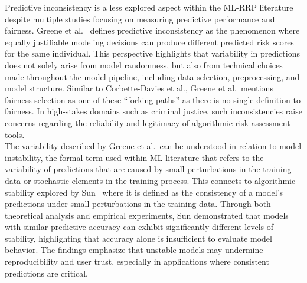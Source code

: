 \documentclass[12pt]{article}
\begin{document}
Predictive inconsistency is a less explored aspect within the ML-RRP literature despite multiple studies focusing on measuring predictive performance and fairness. Greene et al.~\cite{greene2022forks} defines predictive inconsistency as the phenomenon where equally justifiable modeling decisions can produce different predicted risk scores for the same individual. This perspective highlights that variability in predictions does not solely arise from model randomness, but also from technical choices made throughout the model pipeline, including data selection, preprocessing, and model structure. Similar to Corbette-Davies et al., Greene et al.\ mentions fairness selection as one of these ``forking paths'' as there is no single definition to fairness. In high-stakes domains such as criminal justice, such inconsistencies raise concerns regarding the reliability and legitimacy of algorithmic risk assessment tools.\\

The variability described by Greene et al.\ can be understood in relation to model instability, the formal term used within ML literature that refers to the variability of predictions that are caused by small perturbations in the training data or stochastic elements in the training process. This connects to algorithmic stability explored by Sun~\cite{sun2015stability} where it is defined as the consistency of a model's predictions under small perturbations in the training data. Through both theoretical analysis and empirical experiments, Sun demonstrated that models with similar predictive accuracy can exhibit significantly different levels of stability, highlighting that accuracy alone is insufficient to evaluate model behavior. The findings emphasize that unstable models may undermine reproducibility and user trust, especially in applications where consistent predictions are critical. \\
\end{document}
